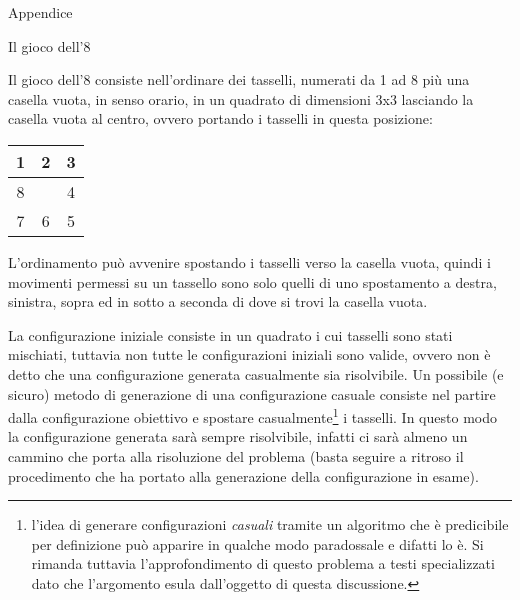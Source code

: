 \begin{chapter}{Appendice}

\begin{section}{Il gioco dell'8}
\label{sec:gioco-filetto}

Il gioco dell'8 consiste nell'ordinare dei tasselli, numerati da 1 ad 8 pi\`u una
casella vuota, in senso orario, in un quadrato di dimensioni 3x3 lasciando la casella
vuota al centro, ovvero portando i tasselli in questa posizione:

\begin{center}
\begin{tabular}{| c | c | c |}
\hline
1 & 2 & 3\\\hline
8 &   & 4\\\hline
7 & 6 & 5\\\hline
\end{tabular}
\end{center}

L'ordinamento pu\`o avvenire spostando i tasselli verso la casella vuota, quindi
i movimenti permessi su un tassello sono solo quelli di uno spostamento a destra,
sinistra, sopra ed in sotto a seconda di dove si trovi la casella vuota.

La configurazione iniziale consiste in un quadrato i cui tasselli sono stati
mischiati, tuttavia non tutte le configurazioni iniziali sono valide, ovvero
non \`e detto che una configurazione generata casualmente sia risolvibile. Un
possibile (e sicuro) metodo di generazione di una configurazione casuale consiste
nel partire dalla configurazione obiettivo e spostare casualmente\footnote{l'idea
di generare configurazioni \textit{casuali} tramite un algoritmo che \`e predicibile
per definizione pu\`o apparire in qualche modo paradossale e difatti lo \`e. Si
rimanda tuttavia l'approfondimento di questo problema a testi specializzati dato
che l'argomento esula dall'oggetto di questa discussione.} i tasselli.
In questo modo la configurazione generata sar\`a sempre risolvibile, infatti
ci sar\`a almeno un cammino che porta alla risoluzione del problema (basta
seguire a ritroso il procedimento che ha portato alla generazione della
configurazione in esame).
\end{section}


\end{chapter}
